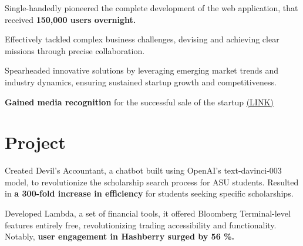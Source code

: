 \documentclass[a4paper]{deedy-resume} %
\begin{document}
\begin{minipage}[t]{0.66\textwidth}

\vspace{\topsep} 

\begin{tightitemize}
\item Single-handedly pioneered the complete development of the web application, that received \textbf{150,000 users overnight. }
\item Effectively tackled complex business challenges, devising and achieving clear missions through precise collaboration.
\item Spearheaded innovative solutions by leveraging emerging market trends and industry dynamics, ensuring sustained startup growth and competitiveness.
\item 
\textbf{Gained media recognition} for the successful sale of the startup 
\href{https://www.deccanherald.com/brandspot/sponsored/meet-the-crypto-boy-of-bengaluru-1221031.html}{(LINK)}
\end{tightitemize}

\sectionspace 





\section{Project}


Created Devil's Accountant, a chatbot built using OpenAI's text-davinci-003 model, to revolutionize the scholarship search process for ASU students. Resulted in \textbf{a 300-fold increase in efficiency} for students seeking specific scholarships.

\sectionspace 




Developed Lambda, a set of financial tools, it offered Bloomberg Terminal-level features entirely free, revolutionizing trading accessibility and functionality. Notably, \textbf{user engagement in Hashberry surged by 56 \%. }\\


\end{minipage}
\end{document}
